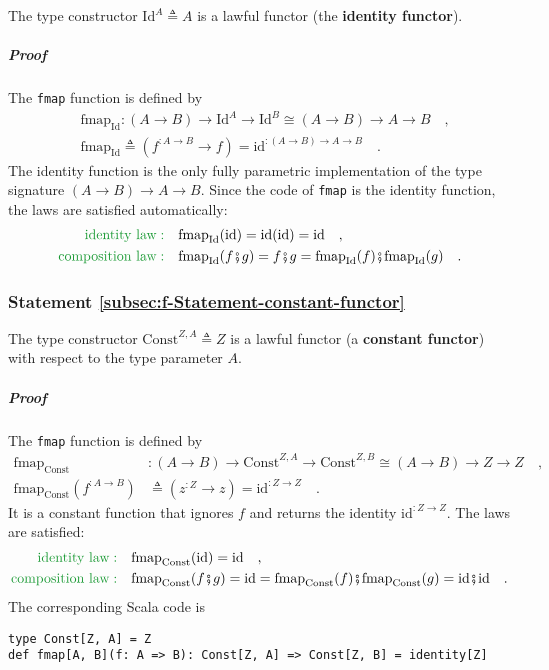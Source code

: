 The type constructor $\text{Id}^{A}\triangleq A$ is a lawful functor
(the \textbf{identity functor}).

\subparagraph{Proof}

The \lstinline!fmap! function is defined by
\begin{align*}
 & \text{fmap}_{\text{Id}}:\left(A\rightarrow B\right)\rightarrow\text{Id}^{A}\rightarrow\text{Id}^{B}\cong\left(A\rightarrow B\right)\rightarrow A\rightarrow B\quad,\\
 & \text{fmap}_{\text{Id}}\triangleq(f^{:A\rightarrow B}\rightarrow f)=\text{id}^{:(A\rightarrow B)\rightarrow A\rightarrow B}\quad.
\end{align*}
The identity function is the only fully parametric implementation
of the type signature $\left(A\rightarrow B\right)\rightarrow A\rightarrow B$.
Since the code of \lstinline!fmap! is the identity function, the
laws are satisfied automatically:
\begin{align*}
{\color{greenunder}\text{identity law}:}\quad & \text{fmap}_{\text{Id}}(\text{id})=\text{id}(\text{id})=\text{id}\quad,\\
{\color{greenunder}\text{composition law}:}\quad & \text{\ensuremath{\text{fmap}_{\text{Id}}}}(f\bef g)=f\bef g=\text{fmap}_{\text{Id}}(f)\bef\text{fmap}_{\text{Id}}(g)\quad.
\end{align*}


\subsubsection{Statement \label{subsec:f-Statement-constant-functor}\ref{subsec:f-Statement-constant-functor}}

The type constructor $\text{Const}^{Z,A}\triangleq Z$
is a lawful functor (a \textbf{constant functor}) with respect to
the type parameter $A$.

\subparagraph{Proof}

The \lstinline!fmap! function is defined by
\begin{align*}
\text{fmap}_{\text{Const}} & :\left(A\rightarrow B\right)\rightarrow\text{Const}^{Z,A}\rightarrow\text{Const}^{Z,B}\cong\left(A\rightarrow B\right)\rightarrow Z\rightarrow Z\quad,\\
\text{fmap}_{\text{Const}}(f^{:A\rightarrow B}) & \triangleq(z^{:Z}\rightarrow z)=\text{id}^{:Z\rightarrow Z}\quad.
\end{align*}
It is a constant function that ignores $f$ and returns the identity
$\text{id}^{:Z\rightarrow Z}$. The laws are satisfied:
\begin{align*}
{\color{greenunder}\text{identity law}:}\quad & \text{fmap}_{\text{Const}}(\text{id})=\text{id}\quad,\\
{\color{greenunder}\text{composition law}:}\quad & \text{\ensuremath{\text{fmap}_{\text{Const}}}}(f\bef g)=\text{id}=\text{fmap}_{\text{Const}}(f)\bef\text{fmap}_{\text{Const}}(g)=\text{id}\bef\text{id}\quad.
\end{align*}
The corresponding Scala code is
\begin{lstlisting}
type Const[Z, A] = Z
def fmap[A, B](f: A => B): Const[Z, A] => Const[Z, B] = identity[Z]
\end{lstlisting}

